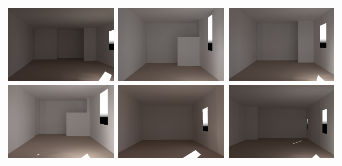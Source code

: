 \documentclass[review]{vgtc}                 %
\begin{document}
\begin{figure}[t]
\includegraphics[width=1.1in]{images/renderings/renovations/063_camera_dark_march_crop.png} \hfill    %
\includegraphics[width=1.1in]{images/renderings/renovations/050_camera_dark_march_crop.png} \hfill    %
\includegraphics[width=1.1in]{images/renderings/no_renovations/070_camera_dark_march_crop.png} \hfill         %
\includegraphics[width=1.1in]{images/renderings/renovations/098_camera_dark_march_crop.png} \hfill    %
\includegraphics[width=1.1in]{images/renderings/no_renovations/user_085_camera_dark_march_crop.png} \hfill    %
\includegraphics[width=1.1in]{images/renderings/renovations/user_046_camera_dark_march_crop.png} \\   %

\vspace{-2.04in}
\begin{minipage}{1.1in}~{\color{white}{\bf N1}}\end{minipage} \hfill
\begin{minipage}{1.1in}~{\color{white}{\bf N2}}\end{minipage} \hfill
\begin{minipage}{1.1in}~{\color{white}{\bf N3}}\end{minipage} \hfill
\begin{minipage}{1.1in}~{\color{white}{\bf N4}}\end{minipage} \hfill
\begin{minipage}{1.1in}~{\color{white}{\bf N5}}\end{minipage} \hfill
\begin{minipage}{1.1in}~{\color{white}{\bf N6}}\end{minipage}
\vspace{1.67in}


\end{figure}
\end{document}
